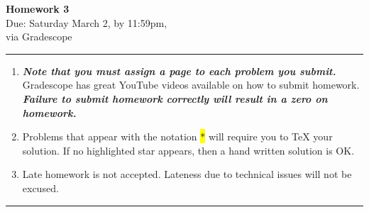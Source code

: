\documentclass[12pt]{article}
\newif\ifshow
\begin{document}
\begin{center}
\ifshow
  \textbf{\Large Homework 3 Solution}\\
\else
  \textbf{\Large Homework 3}\\
\fi
Due: Saturday March 2, by 11:59pm,\\via Gradescope\\
\end{center}

\hrule

\vspace{0.2cm}

\begin{enumerate}[$\bullet$]
\item  {\textbf{\textit{Note that you must assign a page to each problem you submit.}}}   Gradescope has great YouTube videos available on how to submit homework.  \textit{\textbf{Failure to submit homework correctly will result in a zero on homework.}}
\item Problems that appear with the notation \colorbox{yellow}{$\ast$} will require you to TeX your solution.  If no highlighted star appears, then a hand written solution is OK.  
\item Late homework is not accepted.  Lateness due to technical issues will not be excused.  
\end{enumerate}

\hrule

\vspace{0.5cm}
\end{document}
